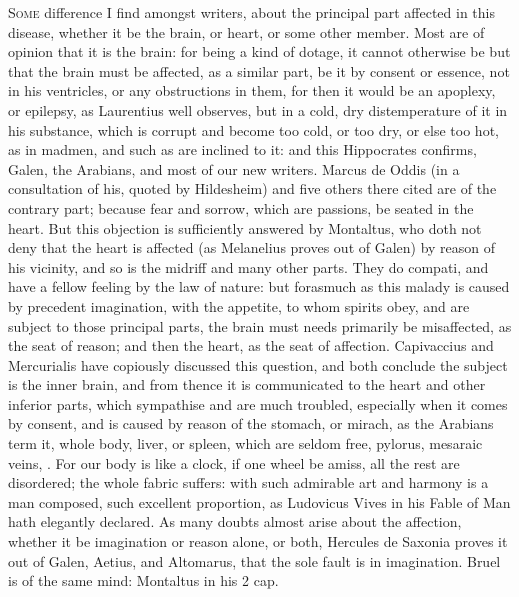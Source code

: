 {\lettrine{S}{ome} difference I find amongst writers, about the principal part
affected in this disease, whether it be the brain, or heart, or some
other member. Most are of opinion that it is the brain: for being a
kind of dotage, it cannot otherwise be but that the brain must be
affected, as a similar part, be it by consent or essence, not in
his ventricles, or any obstructions in them, for then it would be an
apoplexy, or epilepsy, as Laurentius well observes, but in a
cold, dry distemperature of it in his substance, which is corrupt and
become too cold, or too dry, or else too hot, as in madmen, and such as
are inclined to it: and this  Hippocrates confirms, Galen, the
Arabians, and most of our new writers. Marcus de Oddis (in a
consultation of his, quoted by Hildesheim) and five others there
cited are of the contrary part; because fear and sorrow, which are
passions, be seated in the heart. But this objection is sufficiently
answered by Montaltus, who doth not deny that the heart is
affected (as Melanelius proves out of Galen) by reason of his
vicinity, and so is the midriff and many other parts. They do compati,
and have a fellow feeling by the law of nature: but forasmuch as this
malady is caused by precedent imagination, with the appetite, to whom
spirits obey, and are subject to those principal parts, the brain must
needs primarily be misaffected, as the seat of reason; and then the
heart, as the seat of affection. Capivaccius and Mercurialis have
copiously discussed this question, and both conclude the subject is the
inner brain, and from thence it is communicated to the heart and other
inferior parts, which sympathise and are much troubled, especially when
it comes by consent, and is caused by reason of the stomach, or mirach,
as the Arabians term it, whole body, liver, or spleen, which are
seldom free, pylorus, mesaraic veins, \etc{}. For our body is like a clock,
if one wheel be amiss, all the rest are disordered; the whole fabric
suffers: with such admirable art and harmony is a man composed, such
excellent proportion, as Ludovicus Vives in his Fable of Man hath
elegantly declared.
As many doubts almost arise about the affection, whether it be
imagination or reason alone, or both, Hercules de Saxonia proves it out
of Galen, Aetius, and Altomarus, that the sole fault is in
imagination. Bruel is of the same mind: Montaltus in his 2 cap.
}
